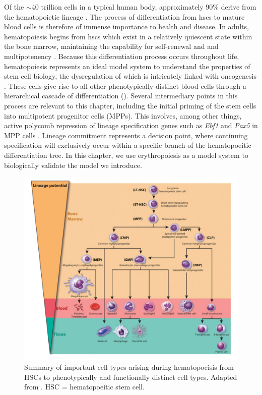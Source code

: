 Of the $\sim$40 trillion cells in a typical human body, approximately 90\% derive from the hematopoietic lineage \cite{Quinlan2010}. The process of differentiation from \glspl{hsc} to mature blood cells is therefore of immense importance to health and disease. In adults, hematopoiesis begins from \glspl{hsc} which exist in a relatively quiescent state within the bone marrow, maintaining the capability for self-renewal and and multipotenency \cite{Baron2012}. Because this differentiation process occurs throughout life, hematopoiesis represents an ideal model system to understand the properties of stem cell biology, the dysregulation of which is intricately linked with oncogenesis \cite{Orkin2008}. These cells give rise to all other phenotypically distinct blood cells through a hierarchical cascade of differentiation (). Several intermediary points in this process are relevant to this chapter, including the initial priming of the stem cells into multipotent progenitor cells (MPPs). This involves, among other things, active polycomb repression of lineage specification genes such as \textit{Ebf1} and \textit{Pax5} in MPP cells \cite{H2010}. Lineage commitment represents a decision point, where continuing specification will exclusively occur within a specific branch of the hematopoeitic differentiation tree. In this chapter, we use erythropoiesis as a model system to biologically validate the model we introduce. 

\begin{figure}
  \centering
  \includegraphics[width=\textwidth]{plot/ch4/hem.pdf}
  \caption[Hematopoiesis schematic]{Summary of important cell types arising during hematopoeisis from HSCs to phenotypically and functionally distinct cell types. Adapted from \textcite{Hu2016}. HSC = hematopoeitic stem cell.}
  \label{fig:hem_sum}
\end{figure}


